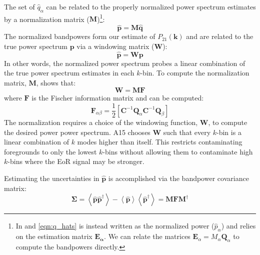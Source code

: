 \documentclass[preprint2,hidelinks]{emulateapj}
\begin{document}
{ The set of $\hat{q}_{\alpha}$ can be related to the properly normalized power spectrum estimates by a normalization matrix ($\mathbf{M}$)\footnote{In \citet{liu_tegmark2011} and \citet{liu_et_al2014b} \autoref{eqn:q_hats} is instead written as the normalized power ($\hat{p}_{\alpha}$) and relies on the estimation matrix $\mathbf{E_{\alpha}}$. We can relate the matrices $\mathbf{E}_{\alpha} = M_{\alpha}\mathbf{Q}_{\alpha}$ to compute the bandpowers directly. }:
 \begin{equation}
 \mathbf{\hat{p}} = \mathbf{M} \mathbf{\hat{q}}
 \end{equation}
The normalized bandpowers form our estimate of $P_{21}(\mathbf{k})$
and are related to the true power spectrum $\mathbf{p}$ via a windowing matrix ($\mathbf{W}$):
\begin{equation}
\mathbf{\hat{p}} = \mathbf{W}\mathbf{p}
\end{equation}
In other words, the normalized power spectrum probes a linear combination of the true power spectrum estimates in each $k$-bin.
To compute the normalization matrix, $\mathbf{M}$, \citet{liu_et_al2014b} shows that:
\begin{equation}
\mathbf{W} = \mathbf{M}\mathbf{F}
\end{equation}
where $\mathbf{F}$ is the Fischer information matrix and can be computed: 
\begin{equation}
\mathbf{F}_{\alpha \beta} = \frac{1}{2}\left[ \mathbf{C}^{-1}\mathbf{Q}_{\alpha}\mathbf{C}^{-1}\mathbf{Q}_{\beta} \right]
\end{equation}
The normalization requires a choice of the windowing function, $\mathbf{W}$, to compute the desired power power spectrum. A15 chooses $\mathbf{W}$ such that every $k$-bin is a linear combination of $k$ modes higher than itself. This restricts contaminating foregrounds to only the lowest $k$-bins without allowing them to contaminate high $k$-bins where the EoR signal may be stronger.

Estimating the uncertainties in $\mathbf{\hat{p}}$ is accomplished via the bandpower covariance matrix:
\begin{equation}
\mathbf{\Sigma} = \left\langle \mathbf{\hat{p}}\mathbf{\hat{p}}^{\dagger} \right\rangle - \left\langle \mathbf{\hat{p}} \right\rangle  \left\langle \mathbf{\hat{p}}^{\dagger} \right\rangle = \mathbf{M}\mathbf{F}\mathbf{M}^{\dagger}
\end{equation}

}
\end{document}
